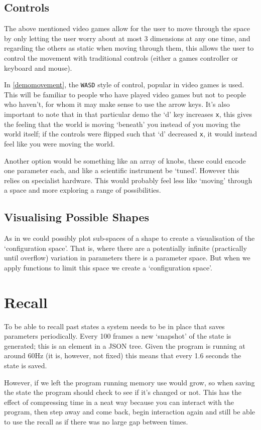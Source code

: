 \subsection{Controls}
The above mentioned video games allow for the user to move through the space by
only letting the user worry about at most 3 dimensions at any one time, and
regarding the others as static when moving through them, this allows the user to
control the movement with traditional controls (either a games controller or
keyboard and mouse).

In \autoref{demomovement}, the \verb|WASD| style of control, popular in video
games is used. This will be familiar to people who have played video games but
not to people who haven't, for whom it may make sense to use the arrow keys.
It's also important to note that in that particular demo the `d' key increases
\verb|x|, this gives the feeling that the world is moving `beneath' you instead
of you moving the world itself; if the controls were flipped such that `d'
decreased \verb|x|, it would instead feel like you were moving the world. 

Another option would be something like an array of knobs, these could encode one
parameter each, and like a scientific instrument be `tuned'. However this relies
on specialist hardware. This would probably feel less like `moving' through a
space and more exploring a range of possibilities.

\subsection{Visualising Possible Shapes}
As in \cite{swayne:dsc2003} we could possibly plot sub-spaces of a shape to
create a visualisation of the `configuration space'. That is, where there are a
potentially infinite (practically until overflow) variation in parameters there
is a parameter space. But when we apply functions to limit this space we create
a `configuration space'.

\section{Recall}
To be able to recall past states a system needs to be in place that saves
parameters periodically. Every 100 frames a new `snapshot' of the state is
generated; this is an element in a JSON tree. Given the program is running at
around 60Hz (it is, however, not fixed) this means that every 1.6 seconds the
state is saved.

However, if we left the program running memory use would grow, so when saving
the state the program should check to see if it's changed or not. This has the
effect of compressing time in a neat way because you can interact with the
program, then step away and come back, begin interaction again and still be able
to use the recall as if there was no large gap between times.

